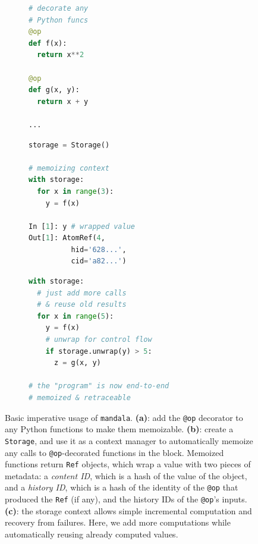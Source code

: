 \begin{figure}[h]
\centering
\begin{subfigure}{0.23\textwidth}
\centering
\begin{lstlisting}[language=python]
# decorate any
# Python funcs
@op
def f(x):
  return x**2

@op
def g(x, y):
  return x + y

...
\end{lstlisting}
\caption{}
\end{subfigure}
\begin{subfigure}{0.35\textwidth}
\centering
\begin{lstlisting}[language=python]
storage = Storage()

# memoizing context
with storage:
  for x in range(3):
    y = f(x)

In [1]: y # wrapped value
Out[1]: AtomRef(4,
          hid='628...',
          cid='a82...')
\end{lstlisting}
\caption{}
\end{subfigure}
\begin{subfigure}{0.4\textwidth}
\centering
\begin{lstlisting}[language=python]
with storage:
  # just add more calls
  # & reuse old results
  for x in range(5):
    y = f(x)
    # unwrap for control flow
    if storage.unwrap(y) > 5:
      z = g(x, y)

# the "program" is now end-to-end
# memoized & retraceable
\end{lstlisting}
\caption{}
\end{subfigure}
\caption{Basic imperative usage of \texttt{mandala}. \textbf{(a)}: add the \texttt{@op}
decorator to any Python functions to make them memoizable. \textbf{(b)}:
create a \texttt{Storage}, and use it as a context manager to automatically
memoize any calls to \texttt{@op}-decorated functions in the block. Memoized
functions return \texttt{Ref} objects, which wrap a value with two pieces of
metadata: a \emph{content ID}, which is a hash of the value of the
object, and a \emph{history ID}, which is a hash of the identity of the
\texttt{@op} that produced the \texttt{Ref} (if any), and the history IDs of the
\texttt{@op}'s inputs. \textbf{(c)}: the storage context allows simple
incremental computation and recovery from failures. Here, we add more
computations while automatically reusing already computed values.}
\label{fig:basic-usage}
\end{figure}

